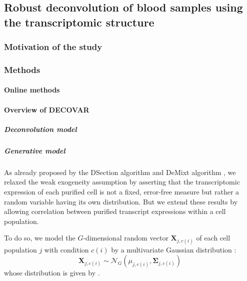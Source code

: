 \subsection{Robust deconvolution of blood samples using the transcriptomic structure}

\subsubsection{Motivation of the study}

\subsubsection{Methods}

\paragraph{Online methods}

\paragraph{Overview of DECOVAR}
\subparagraph{Deconvolution model}
\clearpage
\subparagraph{Generative model}

As already proposed by the DSection algorithm \parencite{erkkila_etal10} and DeMixt algorithm \parencite{wang_etal18}, we relaxed the weak \gls{exogeneity} assumption by asserting that the transcriptomic expression of each purified cell is not a fixed, error-free measure but rather a random variable having its own distribution. But we extend these results by allowing correlation between purified transcript expressions within a cell population.

To do so, we model the $G$-dimensional random vector $\boldsymbol{X}_{j, c(i)}$ of each cell population $j$ with condition $c(i)$ by a multivariate Gaussian distribution :
\begin{equation}
\label{eq:10}
\boldsymbol{X}_{j, c(i)} \sim \mathcal{N}_G(\mu_{j, c(i)}, \boldsymbol{\Sigma}_{j, c(i)})
\end{equation}
whose distribution is given by .

